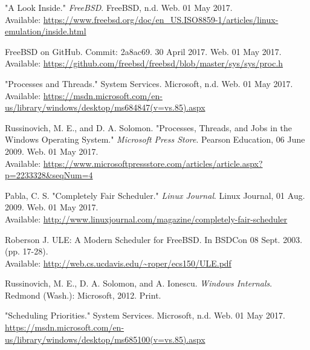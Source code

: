 \documentclass[10pt,draftclsnofoot,onecolumn,journal,compsoc]{IEEEtran}
\begin{document}
\begin{thebibliography}{18}
"A Look Inside." \textit{FreeBSD}. FreeBSD, n.d. Web. 01 May 2017. \\
Available: \url{https://www.freebsd.org/doc/en_US.ISO8859-1/articles/linux-emulation/inside.html}

FreeBSD on GitHub. Commit: 2a8ac69. 30 April 2017. Web. 01 May 2017. \\
Available: \url{https://github.com/freebsd/freebsd/blob/master/sys/sys/proc.h}

"Processes and Threads." System Services. Microsoft, n.d. Web. 01 May 2017. \\
Available: \url{https://msdn.microsoft.com/en-us/library/windows/desktop/ms684847(v=vs.85).aspx}

Russinovich, M. E., and D. A. Solomon. "Processes, Threads, and Jobs in the Windows Operating System." \textit{Microsoft Press Store}. Pearson Education, 06 June 2009. Web. 01 May 2017. \\
Available: \url{https://www.microsoftpressstore.com/articles/article.aspx?p=2233328&seqNum=4}

Pabla, C. S. "Completely Fair Scheduler." \textit{Linux Journal}. Linux Journal, 01 Aug. 2009. Web. 01 May 2017. \\
Available: \url{http://www.linuxjournal.com/magazine/completely-fair-scheduler}

Roberson J. ULE: A Modern Scheduler for FreeBSD. In BSDCon 08 Sept. 2003. (pp. 17-28). \\
Available: \url{http://web.cs.ucdavis.edu/~roper/ecs150/ULE.pdf}

Russinovich, M. E., D. A. Solomon, and A. Ionescu. \textit{Windows Internals}. Redmond (Wash.): Microsoft, 2012. Print.

"Scheduling Priorities." System Services. Microsoft, n.d. Web. 01 May 2017. \\
\url{https://msdn.microsoft.com/en-us/library/windows/desktop/ms685100(v=vs.85).aspx}

\end{thebibliography}
\end{document}
